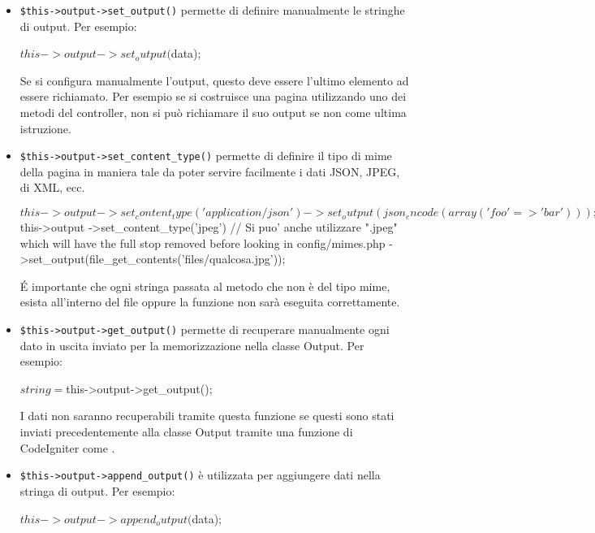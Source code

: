 \begin{itemize}
\item \verb|$this->output->set_output()| permette di definire manualmente le stringhe di output. Per esempio:

\begin{code}
$this->output->set_output($data);
\end{code}

Se si configura manualmente l'output, questo deve essere l'ultimo elemento ad essere richiamato. Per esempio se si costruisce una pagina utilizzando uno dei metodi del controller, non si può richiamare il suo output se non come ultima istruzione.

\item \verb|$this->output->set_content_type()| permette di definire il tipo di mime della pagina in maniera tale da poter servire  facilmente i dati JSON, JPEG, di XML, ecc.

\begin{code}
$this->output
    ->set_content_type('application/json')
    ->set_output(json_encode(array('foo' => 'bar')));

$this->output
    ->set_content_type('jpeg') // Si puo' anche utilizzare ".jpeg" which will have the full stop removed before looking in config/mimes.php
    ->set_output(file_get_contents('files/qualcosa.jpg'));
\end{code}

\'E importante che ogni stringa passata al metodo che non è del tipo mime, esista all'interno del file  oppure la funzione non sarà eseguita correttamente.

\item \verb|$this->output->get_output()| permette di recuperare manualmente ogni dato in uscita inviato per la memorizzazione nella classe Output. Per esempio:

\begin{code}
$string = $this->output->get_output();
\end{code}

I dati non saranno recuperabili tramite questa funzione se questi sono stati inviati precedentemente alla classe Output tramite una funzione di CodeIgniter come .

\item \verb|$this->output->append_output()| è utilizzata per aggiungere dati nella stringa di output. Per esempio:

\begin{code}
$this->output->append_output($data);
\end{code}


\end{itemize}
